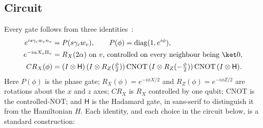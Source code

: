 \documentclass[11pt,a4paper]{article}
\begin{document}
\subsection{Circuit}
Every gate follows from three identities~\cite{nielsen2010quantum,barenco1995elementary}:
\begin{align}
e^{is\gamma_cw_vn_v}&=P(s\gamma_cw_v),\qquad P(\phi)=\mathrm{diag}(1,e^{i\phi}),\label{eq:g1}\\
e^{-i\alpha X_v\Pi_v}&=\text{$R_X(2\alpha)$ on $v$, controlled on every neighbour being $\ket0$},\label{eq:g2}\\
CR_X(\phi)&=(I\otimes\mathsf H)\,(I\otimes R_Z(\tfrac\phi2))\,\mathrm{CNOT}\,(I\otimes R_Z(-\tfrac\phi2))\,\mathrm{CNOT}\,(I\otimes\mathsf H).\label{eq:g3}
\end{align}
Here $P(\phi)$ is the phase gate; $R_X(\phi)=e^{-i\phi X/2}$ and $R_Z(\phi)=e^{-i\phi Z/2}$ are
rotations about the $x$ and $z$ axes; $CR_X$ is $R_X$ controlled by one qubit; CNOT is the
controlled-NOT; and $\mathsf H$ is the Hadamard gate, in sans-serif to distinguish it from the
Hamiltonian $H$. Each identity, and each choice in the circuit below, is a standard construction:
\end{document}
